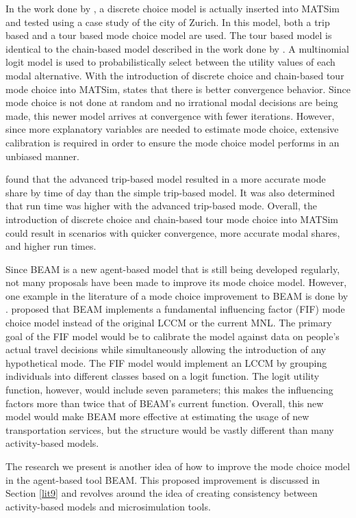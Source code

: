 \documentclass[3p, authoryear, review]{elsarticle} %
\begin{document}
In the work done by \citet{horl19}, a discrete choice model is actually inserted into MATSim and tested using a case study of the city of Zurich. In this model, both a trip based and a tour based mode choice model are used. The tour based model is identical to the chain-based model described in the work done by \citet{horl18}. A multinomial logit model is used to probabilistically select between the utility values of each modal alternative. With the introduction of discrete choice and chain-based tour mode choice into MATSim, \citet{horl19} states that there is better convergence behavior. Since mode choice is not done at random and no irrational modal decisions are being made, this newer model arrives at convergence with fewer iterations. However, since more explanatory variables are needed to estimate mode choice, extensive calibration is required in order to ensure the mode choice model performs in an unbiased manner.

\citet{horl19} found that the advanced trip-based model resulted in a more accurate mode share by time of day than the simple trip-based model. It was also determined that run time was higher with the advanced trip-based mode. Overall, the introduction of discrete choice and chain-based tour mode choice into MATSim could result in scenarios with quicker convergence, more accurate modal shares, and higher run times.

Since BEAM is a new agent-based model that is still being developed regularly, not many proposals have been made to improve its mode choice model. However, one example in the literature of a mode choice improvement to BEAM is done by \citet{barth20}. \citet{barth20} proposed that BEAM implements a fundamental influencing factor (FIF) mode choice model instead of the original LCCM or the current MNL. The primary goal of the FIF model would be to calibrate the model against data on people's actual travel decisions while simultaneously allowing the introduction of any hypothetical mode. The FIF model would implement an LCCM by grouping individuals into different classes based on a logit function. The logit utility function, however, would include seven parameters; this makes the influencing factors more than twice that of BEAM's current function. Overall, this new model would make BEAM more effective at estimating the usage of new transportation services, but the structure would be vastly different than many activity-based models.

The research we present is another idea of how to improve the mode choice model in the agent-based tool BEAM. This proposed improvement is discussed in Section \ref{lit9} and revolves around the idea of creating consistency between activity-based models and microsimulation tools.
\end{document}
